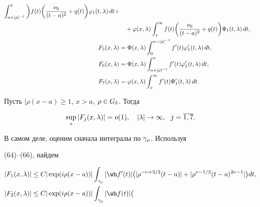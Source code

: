 \begin{pf}
\begin{align*}
\int^x_{a+|\rho|^{-1}}\bigg)f(t)\bigg( \frac{\nu_0}{(t-a)^2}


+q(t)\bigg)\vv_1(t,\la)\,dt + \\


%


&\quad +\vv(x,\la)  \int_x^\iy f(t)\bigg( \frac{\nu_0}{(t-a)^2}


+q(t)\bigg)\Phi_1(t,\la)\,dt, \\


%


F_5(x,\la)&=\Phi(x,\la) \int_0^{a-|\rho|^{-1}}f'(t)\vv'_1(t,\la)\,dt, \\


%


F_6(x,\la)&=\Phi(x,\la) \int^x_{a+|\rho|^{-1}}f'(t)\vv'_1(t,\la)\,dt, \\


%


F_7(x,\la)&=\vv(x,\la)  \int^\iy_x f'(t)\Phi'_1(t,\la)\,dt.


\end{align*}





\begin{lem}


Пусть $|\rho(x-a)\ge 1$, $x>a$, $\rho\in G_{\delta}$. Тогда


\begin{equation}


\sup_x |F_j(x,\la)|=o(1),\quad |\la|\to\iy,\ \ j=\overline{1,7}.


\end{equation}


\end{lem}





\begin{pf}


В самом деле, оценим сначала интегралы по $\gamma_{\rho}$. Используя


(64)--(66), найдем


\begin{align*}


|F_1(x,\la)|&\le C|\exp(i\rho(x-a))|  \int_{\ga_{\rho}} |\wh f'(t)|\big(


|\rho^{-\nu+3/2}(t-a)|+|\rho^{\nu-1/2}(t-a)^{2\nu-1}|\big) dt,\\


%


|F_2(x,\la)|&\le C|\exp(i\rho(x-a))|  \int_{\ga_{\rho}} |\wh f(t)|\big(



\end{align*}
\end{pf}
\end{pf}
